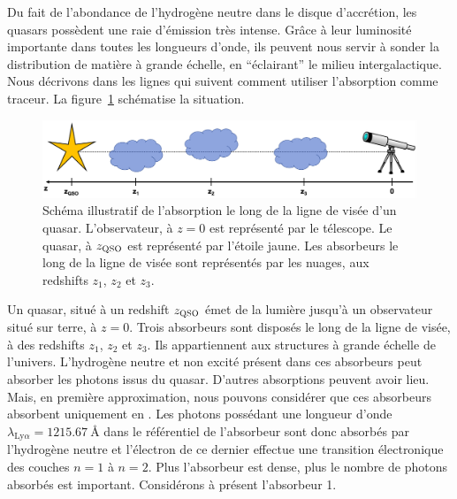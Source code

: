 \documentclass[11pt, twoside, a4paper, openright]{report}
\begin{document}
Du fait de l'abondance de l'hydrogène neutre dans le disque d'accrétion, les quasars possèdent une raie d'émission \lya{} très intense. Grâce à leur luminosité importante dans toutes les longueurs d'onde, ils peuvent nous servir à sonder la distribution de matière à grande échelle, en ``éclairant'' le milieu intergalactique.
Nous décrivons dans les lignes qui suivent comment utiliser l'absorption \lya{} comme traceur.
La figure~\ref{fig:schema_lya} schématise la situation.
\begin{figure}
  \centering
  \includegraphics[scale=0.4]{schema_lya}
  \caption{Schéma illustratif de l'absorption le long de la ligne de visée d'un quasar. L'observateur, à $z=0$ est représenté par le télescope. Le quasar, à $z_{\textsc{QSO}}$ est représenté par l'étoile jaune. Les absorbeurs le long de la ligne de visée sont représentés par les nuages, aux redshifts $z_{1}$, $z_{2}$ et $z_{3}$.}
  \label{fig:schema_lya}
\end{figure}
Un quasar, situé à un redshift $z_{\textsc{QSO}}$ émet de la lumière jusqu'à un observateur situé sur terre, à $z=0$. Trois absorbeurs sont disposés le long de la ligne de visée, à des redshifts $z_1$, $z_2$ et $z_3$. Ils appartiennent aux structures à grande échelle de l'univers. L'hydrogène neutre et non excité présent dans ces absorbeurs peut absorber les photons issus du quasar.
D'autres absorptions peuvent avoir lieu. Mais, en première approximation, nous pouvons considérer que ces absorbeurs absorbent uniquement en \lya{}.
Les photons possédant une longueur d'onde $\lambda_{\mathrm{Ly}\alpha} = \SI{1215.67}{\angstrom}$ dans le référentiel de l'absorbeur sont donc absorbés par l'hydrogène neutre et l'électron de ce dernier effectue une transition électronique des couches $n=1$ à $n=2$. Plus l'absorbeur est dense, plus le nombre de photons absorbés est important. Considérons à présent l'absorbeur 1.
\end{document}
